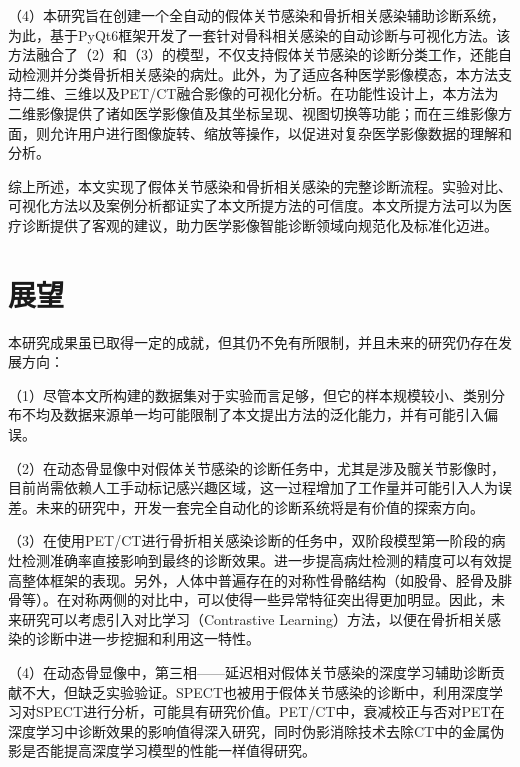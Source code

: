 （4）本研究旨在创建一个全自动的假体关节感染和骨折相关感染辅助诊断系统，为此，基于PyQt6框架开发了一套针对骨科相关感染的自动诊断与可视化方法。该方法融合了（2）和（3）的模型，不仅支持假体关节感染的诊断分类工作，还能自动检测并分类骨折相关感染的病灶。此外，为了适应各种医学影像模态，本方法支持二维、三维以及PET/CT融合影像的可视化分析。在功能性设计上，本方法为二维影像提供了诸如医学影像值及其坐标呈现、视图切换等功能；而在三维影像方面，则允许用户进行图像旋转、缩放等操作，以促进对复杂医学影像数据的理解和分析。

综上所述，本文实现了假体关节感染和骨折相关感染的完整诊断流程。实验对比、可视化方法以及案例分析都证实了本文所提方法的可信度。本文所提方法可以为医疗诊断提供了客观的建议，助力医学影像智能诊断领域向规范化及标准化迈进。

\section{展望}

本研究成果虽已取得一定的成就，但其仍不免有所限制，并且未来的研究仍存在发展方向：

（1）尽管本文所构建的数据集对于实验而言足够，但它的样本规模较小、类别分布不均及数据来源单一均可能限制了本文提出方法的泛化能力，并有可能引入偏误。

（2）在动态骨显像中对假体关节感染的诊断任务中，尤其是涉及髋关节影像时，目前尚需依赖人工手动标记感兴趣区域，这一过程增加了工作量并可能引入人为误差。未来的研究中，开发一套完全自动化的诊断系统将是有价值的探索方向。

（3）在使用PET/CT进行骨折相关感染诊断的任务中，双阶段模型第一阶段的病灶检测准确率直接影响到最终的诊断效果。进一步提高病灶检测的精度可以有效提高整体框架的表现。另外，人体中普遍存在的对称性骨骼结构（如股骨、胫骨及腓骨等）。在对称两侧的对比中，可以使得一些异常特征突出得更加明显。因此，未来研究可以考虑引入对比学习（Contrastive Learning）方法，以便在骨折相关感染的诊断中进一步挖掘和利用这一特性。

（4）在动态骨显像中，第三相——延迟相对假体关节感染的深度学习辅助诊断贡献不大，但缺乏实验验证。SPECT也被用于假体关节感染的诊断中，利用深度学习对SPECT进行分析，可能具有研究价值。PET/CT中，衰减校正与否对PET在深度学习中诊断效果的影响值得深入研究，同时伪影消除技术去除CT中的金属伪影是否能提高深度学习模型的性能一样值得研究。